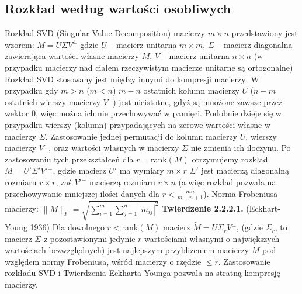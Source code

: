 \documentclass{pracamgr}
\begin{document}
   \subsection{Rozkład według wartości osobliwych}
    Rozkład SVD (Singular Value Decomposition) macierzy $m\times n$ przedstawiony jest wzorem:
    $M=U\Sigma V^\bot$\newline
    gdzie $U$ -- macierz unitarna $m\times m$, $\Sigma$ -- macierz diagonalna zawierająca wartości własne macierzy $M$,
    $V$ -- macierz unitarna $n\times n$\newline
    (w przypadku macierzy nad ciałem rzeczywistym macierze unitarne są ortogonalne)\newline\newline
    Rozkład SVD stosowany jest między innymi do kompresji macierzy:\newline
    W przypadku gdy $m>n$ ($m<n$) $m-n$ ostatnich kolumn macierzy $U$ ($n-m$ ostatnich wierszy macierzy $V^\bot$) jest nieistotne,
    gdyż są mnożone zawsze przez wektor $0$, więc można ich nie przechowywać w pamięci.\newline
    Podobnie dzieje się w przypadku wierszy (kolumn) przypadających na zerowe wartości własne w macierzy $\Sigma$.\newline
    Zastosowanie jednej permutacji do kolumn macierzy $U$, wierszy macierzy $V^\bot$, oraz wartości własnych w macierzy $\Sigma$ nie zmienia ich iloczynu.\newline
    Po zastosowaniu tych przekształceń dla $r=$rank$(M)$ otrzymujemy rozkład $M=U'\Sigma'V'^\bot$, gdzie macierz $U'$ ma wymiary $m\times r$ $\Sigma'$
    jest macierzą diagonalną rozmiaru $r\times r$, zaś $V'^\bot$ macierzą rozmiaru $r\times n$
    (a więc rozkład pozwala na przechowywanie mniejszej ilości danych dla $r<\frac{mn}{m+n+1}$).\newline
    Norma Frobeniusa macierzy: $\lVert M \rVert_F=\sqrt{\sum\limits_{i=1}^{m}\sum\limits_{j=1}^{n}|m_{ij}|^2}$\newline
    \textbf{Twierdzenie 2.2.2.1.} (Eckhart-Young 1936) Dla dowolnego $r<$rank$(M)$
    macierz $\tilde{M}=U\Sigma_r V^\bot$,
    (gdzie $\Sigma_r$, to macierz $\Sigma$ z pozostawionymi jedynie $r$ wartościami własnymi o największych wartościach bezwzględnych)
    jest najlepszym przybliżeniem macierzy $M$ pod względem normy Frobeniusa, wśród macierzy o rzędzie $\le r$.\newline
    Zastosowanie rozkładu SVD i Twierdzenia Eckharta-Younga pozwala na stratną kompresję macierzy.
\end{document}
